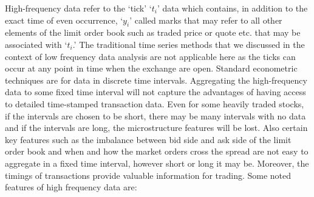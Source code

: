 High-frequency data refer to the `tick' `$t_i$' data which contains, in addition to the exact time of even occurrence, `$y_i$' called marks that may refer to all other elements of the limit order book such as traded price or quote etc. that may be associated with `$t_i$.' The traditional time series methods that we discussed in the context of low frequency data analysis are not applicable here as the ticks can occur at any point in time when the exchange are open. Standard econometric techniques are for data in discrete time intervals. Aggregating the high-frequency data to some fixed time interval will not capture the advantages of having access to detailed time-stamped transaction data. Even for some heavily traded stocks, if the intervals are chosen to be short, there may be many intervals with no data and if the intervals are long, the microstructure features will be lost. Also certain key features such as the imbalance between bid side and ask side of the limit order book and when and how the market orders cross the spread are not easy to aggregate in a fixed time interval, however short or long it may be. Moreover, the timings of transactions provide valuable information for trading. Some noted features of high frequency data are:


